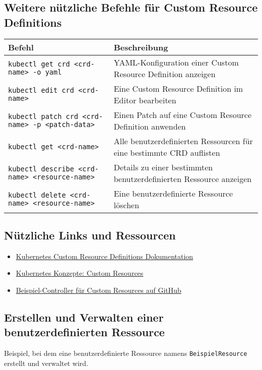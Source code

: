 \subsection{Weitere nützliche Befehle für Custom Resource Definitions}
\begin{tabular}{|p{}|p{}|}
\hline
\textbf{Befehl} & \textbf{Beschreibung} \\
\hline
\texttt{kubectl get crd <crd-name> -o yaml} & YAML-Konfiguration einer Custom Resource Definition anzeigen \\
\texttt{kubectl edit crd <crd-name>} & Eine Custom Resource Definition im Editor bearbeiten \\
\texttt{kubectl patch crd <crd-name> -p <patch-data>} & Einen Patch auf eine Custom Resource Definition anwenden \\
\texttt{kubectl get <crd-name>} & Alle benutzerdefinierten Ressourcen für eine bestimmte CRD auflisten \\
\texttt{kubectl describe <crd-name> <resource-name>} & Details zu einer bestimmten benutzerdefinierten Ressource anzeigen \\
\texttt{kubectl delete <crd-name> <resource-name>} & Eine benutzerdefinierte Ressource löschen \\
\hline
\end{tabular}

\subsection*{Nützliche Links und Ressourcen}
\begin{itemize}
    \item \href{https://kubernetes.io/docs/tasks/extend-kubernetes/custom-resources/custom-resource-definitions/}{Kubernetes Custom Resource Definitions Dokumentation}
    \item \href{https://kubernetes.io/docs/concepts/extend-kubernetes/api-extension/custom-resources/}{Kubernetes Konzepte: Custom Resources}
    \item \href{https://github.com/kubernetes/sample-controller}{Beispiel-Controller für Custom Resources auf GitHub}
\end{itemize}
\newpage
\subsection{Erstellen und Verwalten einer benutzerdefinierten Ressource}
Beispiel, bei dem eine benutzerdefinierte Ressource namens \texttt{BeispielResource} erstellt und verwaltet wird.

